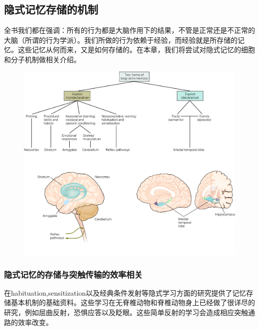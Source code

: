 \documentclass[UTF8,nofonts]{ctexart}
\begin{document}
\subsection{隐式记忆存储的机制}
全书我们都在强调：所有的行为都是大脑作用下的结果，不管是正常还是不正常的大脑（所谓的行为学派）。我们所做的行为依赖于经验，而经验就是所存储的记忆。这些记忆从何而来，又是如何存储的。在本章，我们将尝试对隐式记忆的细胞和分子机制做相关介绍。
\begin{figure}[h]
	\centering
	\includegraphics[scale=0.8]{Pic/6601_PNS5.jpg}
\end{figure}
\subsubsection{隐式记忆的存储与突触传输的效率相关}
在habituation,sensitization以及经典条件发射等隐式学习方面的研究提供了记忆存储基本机制的基础资料。这些学习在无脊椎动物和脊椎动物身上已经做了很详尽的研究，例如屈曲反射，恐惧应答以及眨眼。这些简单反射的学习会造成相应突触通路的效率改变。
\end{document}
